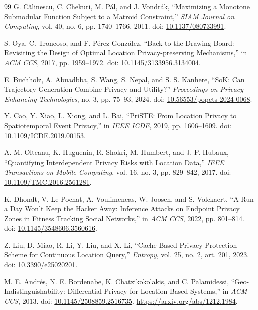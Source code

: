 \documentclass[12pt,a4paper,oneside]{report}
\begin{document}
\begin{thebibliography}{99}
G. Călinescu, C. Chekuri, M. Pál, and J. Vondrák,
``Maximizing a Monotone Submodular Function Subject to a Matroid Constraint,''
\emph{SIAM Journal on Computing}, vol. 40, no. 6, pp. 1740--1766, 2011.
doi: \href{https://doi.org/10.1137/080733991}{10.1137/080733991}.

S. Oya, C. Troncoso, and F. Pérez-González,
``Back to the Drawing Board: Revisiting the Design of Optimal Location Privacy-preserving Mechanisms,''
in \emph{ACM CCS}, 2017, pp. 1959--1972.
doi: \href{https://doi.org/10.1145/3133956.3134004}{10.1145/3133956.3134004}.

E. Buchholz, A. Abuadbba, S. Wang, S. Nepal, and S. S. Kanhere,
``SoK: Can Trajectory Generation Combine Privacy and Utility?''
\emph{Proceedings on Privacy Enhancing Technologies}, no. 3, pp. 75--93, 2024.
doi: \href{https://doi.org/10.56553/popets-2024-0068}{10.56553/popets-2024-0068}.

Y. Cao, Y. Xiao, L. Xiong, and L. Bai,
“PriSTE: From Location Privacy to Spatiotemporal Event Privacy,”
in \emph{IEEE ICDE}, 2019, pp. 1606--1609.
doi: \href{https://doi.org/10.1109/ICDE.2019.00153}{10.1109/ICDE.2019.00153}.

A.-M. Olteanu, K. Huguenin, R. Shokri, M. Humbert, and J.-P. Hubaux,
“Quantifying Interdependent Privacy Risks with Location Data,”
\emph{IEEE Transactions on Mobile Computing}, vol. 16, no. 3,
pp. 829--842, 2017.
doi: \href{https://doi.org/10.1109/TMC.2016.2561281}{10.1109/TMC.2016.2561281}.

K. Dhondt, V. Le Pochat, A. Voulimeneas, W. Joosen, and S. Volckaert,
“A Run a Day Won't Keep the Hacker Away: Inference Attacks on Endpoint Privacy Zones in Fitness Tracking Social Networks,”
in \emph{ACM CCS}, 2022, pp. 801--814.
doi: \href{https://doi.org/10.1145/3548606.3560616}{10.1145/3548606.3560616}.

Z. Liu, D. Miao, R. Li, Y. Liu, and X. Li,
“Cache-Based Privacy Protection Scheme for Continuous Location Query,”
\emph{Entropy}, vol. 25, no. 2, art. 201, 2023.
doi: \href{https://doi.org/10.3390/e25020201}{10.3390/e25020201}.

M. E. Andrés, N. E. Bordenabe, K. Chatzikokolakis, and C. Palamidessi,
``Geo-Indistinguishability: Differential Privacy for Location-Based Systems,''
in \emph{ACM CCS}, 2013.
doi: \href{https://doi.org/10.1145/2508859.2516735}{10.1145/2508859.2516735}.
\url{https://arxiv.org/abs/1212.1984}.


\end{thebibliography}
\end{document}
